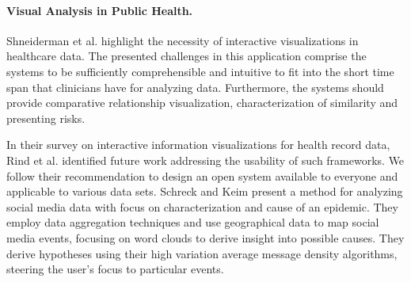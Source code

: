 \documentclass[journal]{style/vgtc} 			          %
\begin{document}
\paragraph{Visual Analysis in Public Health.}
Shneiderman et al. \cite{Shneiderman2013} highlight the necessity of interactive visualizations in healthcare data. %
The presented challenges in this application comprise the systems to be sufficiently comprehensible and intuitive to fit into the short time span that clinicians have for analyzing data.
Furthermore, the systems should provide comparative relationship visualization, characterization of similarity and presenting risks.

In their survey on interactive information visualizations for health record data, Rind et al. \cite{Rind} identified future work addressing the usability of such frameworks.
We follow their recommendation to design an open system available to everyone and applicable to various data sets.
Schreck and Keim \cite{Schreck} present a method for analyzing social media data with focus on characterization and cause of an epidemic.
They employ data aggregation techniques and use geographical data to map social media events, focusing on word clouds to derive insight into possible causes.
They derive hypotheses using their high variation average message density algorithms, steering the user's focus to particular events.
\end{document}
